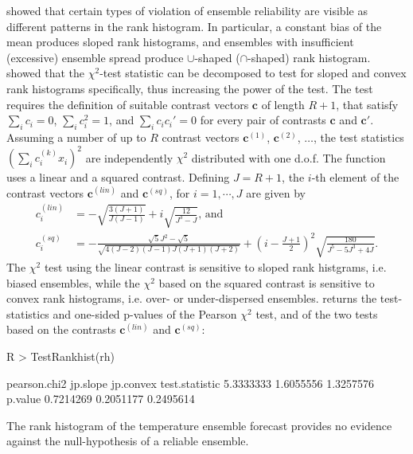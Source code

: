 \documentclass[article]{jss}
\begin{document}
\citet{hamill2001interpretation} showed that certain types of violation of ensemble reliability are visible as different patterns in the rank histogram.
In particular, a constant bias of the mean produces sloped rank histograms, and ensembles with insufficient (excessive) ensemble spread produce $\cup$-shaped ($\cap$-shaped) rank histogram.
\citet{jolliffe2008evaluating} showed that the $\chi^2$-test statistic can be decomposed to test for sloped and convex rank histograms specifically, thus increasing the power of the test.
The test requires the definition of suitable contrast vectors $\mathbf{c}$ of length $R+1$, that satisfy $\sum_i c_i = 0$, $\sum_i c_i^2 = 1$, and $\sum_i c_i c_i' = 0$ for every pair of contrasts $\mathbf{c}$ and $\mathbf{c}'$.
Assuming a number of up to $R$ contrast vectors $\mathbf{c}^{(1)}$, $\mathbf{c}^{(2)}$, $\dots$, the test statistics $(\sum_i c^{(k)}_i x_i)^2$ are independently $\chi^2$ distributed with one d.o.f. 
The function  uses a linear and a squared contrast. Defining $J=R+1$, the $i$-th element of the contrast vectors $\mathbf{c}^{(lin)}$ and $\mathbf{c}^{(sq)}$, for $i=1,\cdots,J$ are given by
%
\begin{align}
c^{(lin)}_i & = -\sqrt{\frac{3(J+1)}{J (J-1)}} + i \sqrt{\frac{12}{J^3 - J}}\text{, and}\\
c^{(sq)}_i & =  - \frac{\sqrt{5}  J^2 - \sqrt{5}}{\sqrt{4(J - 2)  (J-1) J (J+1) (J+2)}}+ \left(i - \frac{J+1}{2}\right)^2   \sqrt{\frac{180}{ J^5 - 5 J^3 + 4 J}}.
\end{align}
%
The $\chi^2$ test using the linear contrast is sensitive to sloped rank histgrams, i.e. biased ensembles, while the $\chi^2$ based on the squared contrast is sensitive to convex rank histograms, i.e. over- or under-dispersed ensembles.
 returns the test-statistics and one-sided p-values of the Pearson $\chi^2$ test, and of the two tests based on the contrasts $\mathbf{c}^{(lin)}$ and $\mathbf{c}^{(sq)}$:
%
\begin{Schunk}
\begin{Sinput}
R > TestRankhist(rh)
\end{Sinput}
\begin{Soutput}
               pearson.chi2  jp.slope jp.convex
test.statistic    5.3333333 1.6055556 1.3257576
p.value           0.7214269 0.2051177 0.2495614
\end{Soutput}
\end{Schunk}
%
The rank histogram of the temperature ensemble forecast provides no evidence against the null-hypothesis of a reliable ensemble.
\end{document}
